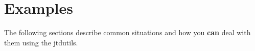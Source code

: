 \section{Examples}

The following sections describe common situations and how you \textbf{can} deal with them using the jtdutils.
